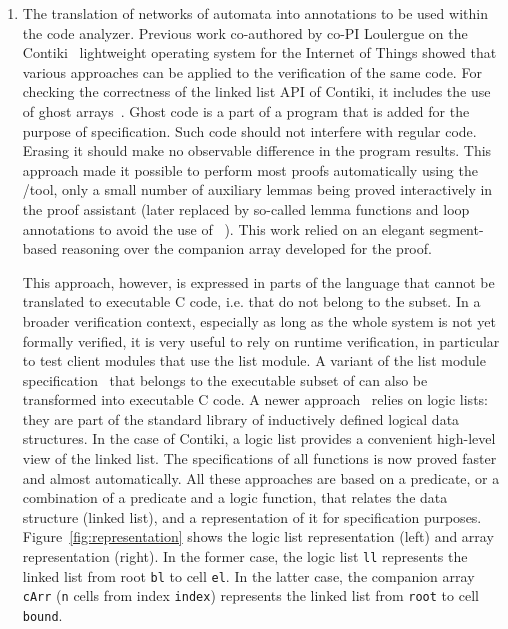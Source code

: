\begin{enumerate}[labelsep=3pt,leftmargin=12pt]
\item The translation of networks of automata into annotations to be used within the \framac code analyzer.
  Previous work co-authored by  co-PI Loulergue on the Contiki~\cite{DGV2004:LCN} lightweight operating system for the Internet of Things showed that various   approaches can be applied to the verification of the same code.
  For checking the correctness of the linked list API of Contiki, it includes the use of ghost arrays~\cite{BKL2018:NFM}.
  Ghost code is a part of a program that is added for the purpose of specification.
  Such code should not interfere with regular code.
  Erasing it should make no observable difference in the program results.
  This approach made it possible to perform most proofs automatically using the \framac/\Wp tool, only a small number of auxiliary lemmas being proved interactively in the \Coq proof assistant
  (later replaced by so-called lemma functions and loop annotations to avoid the use of \Coq~\cite{BLK2019:NFM}).
  This work relied on an elegant segment-based reasoning over the companion array developed for the proof.
  
  This approach, however, is expressed in parts of the \acsl language that cannot be translated to executable C code, i.e. that do not belong to the \eacsl subset.
  In a broader verification context, especially as long as the whole system is not yet formally verified, it is very useful to rely on runtime verification, in particular to test client modules that use the list module.
  A variant of the list module specification~\cite{LBK2018:TAP}  that belongs to the executable subset \eacsl of \acsl can also  be transformed into executable C code.
  A newer approach~\cite{BKL2019:SAC} relies on logic lists: they are part of the \acsl standard library of inductively defined logical data structures.
  In the case of Contiki, a logic list provides a convenient high-level view of the linked list.
  The specifications of all functions is now proved faster and almost automatically.
  All these approaches are based on a predicate, or a combination of a predicate and a logic function, that relates the data structure (linked list), and a representation of it for specification purposes.
  Figure~\ref{fig:representation} shows the logic list representation (left) and array representation (right).
  In the former case, the logic list {\tt ll} represents the linked list from root {\tt bl} to cell {\tt el}.
  In the latter case, the companion array {\tt cArr} ({\tt n} cells from index {\tt index}) represents the linked list from {\tt root} to cell {\tt bound}.



\end{enumerate}
